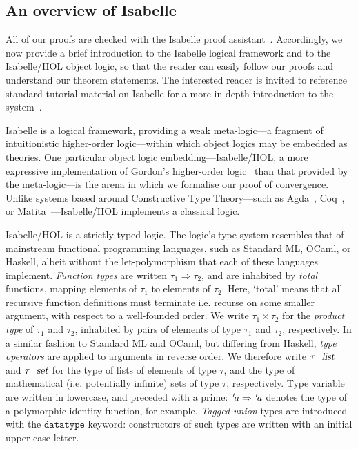 \documentclass[acmlarge,review,anonymous]{acmart}\settopmatter{printfolios=true}
\begin{document}



\subsection{An overview of Isabelle}
\label{subsect.an.overview.of.isabelle}

All of our proofs are checked with the Isabelle proof assistant~\cite{DBLP:conf/tphol/WenzelPN08}.
Accordingly, we now provide a brief introduction to the Isabelle logical framework and to the Isabelle/HOL object logic, so that the reader can easily follow our proofs and understand our theorem statements.
The interested reader is invited to reference standard tutorial material on Isabelle for a more in-depth introduction to the system~\cite{DBLP:books/sp/NipkowK14}.

Isabelle is a logical framework, providing a weak meta-logic---a fragment of intuitionistic higher-order logic---within which object logics may be embedded as theories.
One particular object logic embedding---Isabelle/HOL, a more expressive implementation of Gordon's higher-order logic~\cite{DBLP:conf/tphol/Gordon91} than that provided by the meta-logic---is the arena in which we formalise our proof of convergence.
Unlike systems based around Constructive Type Theory---such as Agda~\cite{DBLP:conf/tphol/BoveDN09}, Coq~\cite{DBLP:conf/popl/HuetH14}, or Matita~\cite{DBLP:conf/cade/AspertiRCT11}---Isabelle/HOL implements a classical logic.

Isabelle/HOL is a strictly-typed logic.
The logic's type system resembles that of mainstream functional programming languages, such as Standard ML, OCaml, or Haskell, albeit without the let-polymorphism that each of these languages implement.
\emph{Function types} are written $\tau_1 \Rightarrow \tau_2$, and are inhabited by \emph{total} functions, mapping elements of $\tau_1$ to elements of $\tau_2$.
Here, `total' means that all recursive function definitions must terminate i.e. recurse on some smaller argument, with respect to a well-founded order.
We write $\tau_1 \times \tau_2$ for the \emph{product type} of $\tau_1$ and $\tau_2$, inhabited by pairs of elements of type $\tau_1$ and $\tau_2$, respectively.
In a similar fashion to Standard ML and OCaml, but differing from Haskell, \emph{type operators} are applied to arguments in reverse order.
We therefore write $\tau\ \isa{list}$ and $\tau\ \isa{set}$ for the type of lists of elements of type $\tau$, and the type of mathematical (i.e. potentially infinite) sets of type $\tau$, respectively.
Type variable are written in lowercase, and preceded with a prime: ${\emph{$\mskip2mu{'}\mskip-2mu$}}a \Rightarrow {\emph{$\mskip2mu{'}\mskip-2mu$}}a$ denotes the type of a polymorphic identity function, for example.
\emph{Tagged union} types are introduced with the $\mathtt{datatype}$ keyword: constructors of such types are written with an initial upper case letter.
\end{document}
